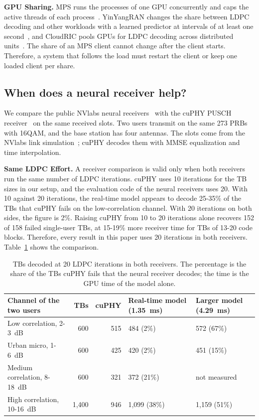\documentclass[acmsmall,screen,review,anonymous]{acmart}
\begin{document}
\noindent\textbf{GPU Sharing.} MPS runs the processes of one GPU concurrently and caps the active threads of
each process~\cite{nvidiampS}. YinYangRAN changes the share between LDPC decoding and other workloads with
a learned predictor at intervals of at least one second~\cite{yinyangran}, and CloudRIC pools GPUs for LDPC
decoding across distributed units~\cite{cloudric}. The share of an MPS client cannot change after the client
starts. Therefore, a system that follows the load must restart the client or keep one loaded client per
share.

\subsection{When does a neural receiver help?}

We compare the public NVlabs neural receivers~\cite{nrx5g,nrxrt,neuralrxsw} with the cuPHY PUSCH
receiver~\cite{aerial} on the same received slots. Two users transmit on the same 273 PRBs with 16QAM, and
the base station has four antennas. The slots come from the NVlabs link simulation~\cite{sionna}; cuPHY
decodes them with MMSE equalization and time interpolation.

\noindent\textbf{Same LDPC Effort.} A receiver comparison is valid only when both receivers run the same
number of LDPC iterations. cuPHY uses 10 iterations for the TB sizes in our setup, and the evaluation code
of the neural receivers uses 20. With 10 against 20 iterations, the real-time model appears to decode
25-35\% of the TBs that cuPHY fails on the low-correlation channel. With 20 iterations on both sides, the
figure is 2\%. Raising cuPHY from 10 to 20 iterations alone recovers 152 of 158 failed single-user TBs, at
15-19\% more receiver time for TBs of 13-20 code blocks. Therefore, every result in this paper uses 20
iterations in both receivers. Table~\ref{tab:receivers} shows the comparison.

\begin{table}[t]
\caption{TBs decoded at 20 LDPC iterations in both receivers. The percentage is the share of the TBs cuPHY
fails that the neural receiver decodes; the time is the GPU time of the model alone.}
\label{tab:receivers}
\footnotesize
\begin{tabular}{@{}lrrll@{}}
\toprule
Channel of the two users & TBs & cuPHY & Real-time model (1.35~ms) & Larger model (4.29~ms) \\
\midrule
Low correlation, 2-3~dB & 600 & 515 & 484 (2\%) & 572 (67\%) \\
Urban micro, 1-6~dB & 600 & 425 & 420 (2\%) & 451 (15\%) \\
Medium correlation, 8-18~dB & 600 & 321 & 372 (21\%) & not measured \\
High correlation, 10-16~dB & 1,400 & 946 & 1,099 (38\%) & 1,159 (51\%) \\
\bottomrule
\end{tabular}
\end{table}
\end{document}
